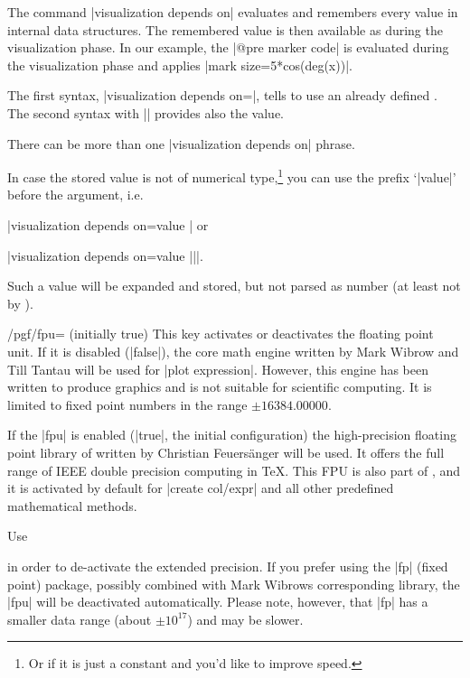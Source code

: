 \begin{pgfplotskeylist}
    The command |visualization depends on| evaluates and remembers every value
    in internal data structures. The remembered value is then available as
     during the visualization phase. In our example,
    the |@pre marker code| is evaluated during the visualization phase and
    applies |mark size=5*cos(deg(x))|.

    The first syntax, |visualization depends on=|,
    tells \PGFPlots{} to use an already defined .
    The second syntax with |\as|
    provides also the value.

    There can be more than one |visualization depends on| phrase.

    In case the stored value is not of numerical type,\footnote{Or if it is just
    a constant and you'd like to improve speed.} you can use the prefix
    `|value|' before the argument, i.e.\@

    |visualization depends on=value | or

    |visualization depends on=value ||\as |.

    Such a value will be expanded and stored, but not parsed as number (at
    least not by \PGFPlots).
\end{pgfplotskeylist}

\begin{key}{/pgf/fpu= (initially true)}
    This key activates or deactivates the floating point unit. If it is
    disabled (|false|), the core \PGF{} math engine written by Mark Wibrow and
    Till Tantau will be used for |plot expression|. However, this engine has
    been written to produce graphics and is not suitable for scientific
    computing. It is limited to fixed point numbers in the range $\pm
    16384.00000$.

    If the |fpu| is enabled (|true|, the initial configuration) the
    high-precision floating point library of \PGF{} written by Christian
    Feuers\"anger will be used. It offers the full range of IEEE double
    precision computing in \TeX{}. This FPU is also part of \PGFPlotstable{},
    and it is activated by default for |create col/expr| and all other
    predefined mathematical methods.

    Use
\begin{codeexample}
\end{codeexample}
    \noindent in order to de-activate the extended precision. If you prefer
    using the |fp| (fixed point) package, possibly combined with Mark Wibrows
    corresponding \PGF{} library, the |fpu| will be deactivated automatically.
    Please note, however, that |fp| has a smaller data range (about $\pm
    10^{17}$) and may be slower.
\end{key}
